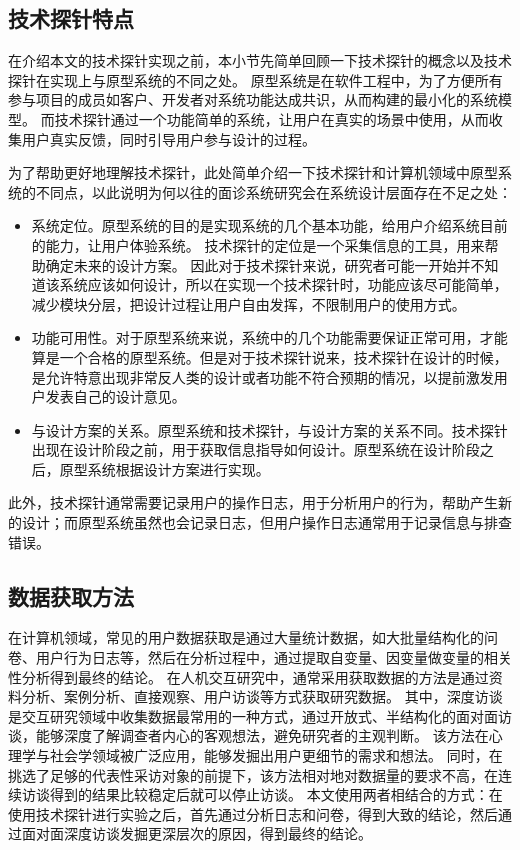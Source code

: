 \subsection{技术探针特点}
在介绍本文的技术探针实现之前，本小节先简单回顾一下技术探针的概念以及技术探针在实现上与原型系统的不同之处。
原型系统是在软件工程中，为了方便所有参与项目的成员如客户、开发者对系统功能达成共识，从而构建的最小化的系统模型。
而技术探针通过一个功能简单的系统，让用户在真实的场景中使用，从而收集用户真实反馈，同时引导用户参与设计的过程。

为了帮助更好地理解技术探针，此处简单介绍一下技术探针和计算机领域中原型系统的不同点，以此说明为何以往的面诊系统研究会在系统设计层面存在不足之处：

\begin{itemize}
    \item 系统定位。原型系统的目的是实现系统的几个基本功能，给用户介绍系统目前的能力，让用户体验系统。
    技术探针的定位是一个采集信息的工具，用来帮助确定未来的设计方案。
    因此对于技术探针来说，研究者可能一开始并不知道该系统应该如何设计，所以在实现一个技术探针时，功能应该尽可能简单，减少模块分层，把设计过程让用户自由发挥，不限制用户的使用方式。
    \item 功能可用性。对于原型系统来说，系统中的几个功能需要保证正常可用，才能算是一个合格的原型系统。但是对于技术探针说来，技术探针在设计的时候，是允许特意出现非常反人类的设计或者功能不符合预期的情况，以提前激发用户发表自己的设计意见。
    \item 与设计方案的关系。原型系统和技术探针，与设计方案的关系不同。技术探针出现在设计阶段之前，用于获取信息指导如何设计。原型系统在设计阶段之后，原型系统根据设计方案进行实现。
\end{itemize}
此外，技术探针通常需要记录用户的操作日志，用于分析用户的行为，帮助产生新的设计；而原型系统虽然也会记录日志，但用户操作日志通常用于记录信息与排查错误。

\subsection{数据获取方法}
在计算机领域，常见的用户数据获取是通过大量统计数据，如大批量结构化的问卷、用户行为日志等，然后在分析过程中，通过提取自变量、因变量做变量的相关性分析得到最终的结论。
在人机交互研究中，通常采用获取数据的方法是通过资料分析、案例分析、直接观察、用户访谈等方式获取研究数据。
其中，深度访谈是交互研究领域中收集数据最常用的一种方式，通过开放式、半结构化的面对面访谈，能够深度了解调查者内心的客观想法，避免研究者的主观判断。
该方法在心理学与社会学领域被广泛应用，能够发掘出用户更细节的需求和想法。
同时，在挑选了足够的代表性采访对象的前提下，该方法相对地对数据量的要求不高，在连续访谈得到的结果比较稳定后就可以停止访谈\cite{cleary2014data}。
本文使用两者相结合的方式：在使用技术探针进行实验之后，首先通过分析日志和问卷，得到大致的结论，然后通过面对面深度访谈发掘更深层次的原因，得到最终的结论。

